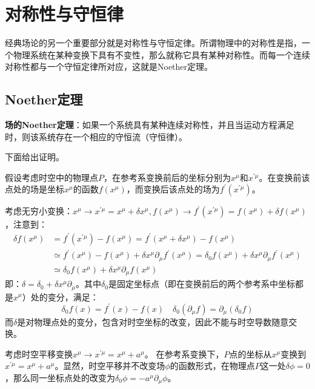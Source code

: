 \documentclass{book}
\begin{document}
\section{对称性与守恒律}
经典场论的另一个重要部分就是对称性与守恒定律。所谓物理中的对称性是指，一个物理系统在某种变换下具有不变性，那么就称它具有某种对称性。而每一个连续对称性都与一个守恒定律所对应，这就是Noether定理。

\subsection{Noether定理}
\textbf{场的Noether定理}：如果一个系统具有某种连续对称性，并且当运动方程满足时，则该系统存在一个相应的守恒流（守恒律）。

下面给出证明。

假设考虑时空中的物理点$P$，在参考系变换前后的坐标分别为$x^{\mu}$和$x^{\prime\mu}$。在变换前该点处的场是坐标$x^\mu$的函数$f(x^\mu)$，而变换后该点处的场为$f^\prime(x^{\prime\mu})$。

考虑无穷小变换：$x^\mu\to x^{\prime\mu}=x^{\mu}+\delta x^{\mu},f(x^\mu)\to f^\prime(x^{\prime\mu})=f(x^\mu)+\delta f(x^\mu)$，注意到：
\begin{equation}
\begin{aligned}
\delta f(x^\mu)&=f^\prime(x^{\prime \mu})-f(x^\mu)=f^\prime(x^{\mu}+\delta x^{\mu})-f(x^\mu)\\&\simeq f^\prime(x^\mu)-f(x^\mu)+\delta x^\mu \partial_\mu f^\prime(x^\mu)
=\delta_0 f(x^\mu)+\delta x^\mu \partial_\mu f^\prime(x^\mu)\\&\simeq\delta_0 f(x^\mu)+\delta x^\mu \partial_\mu f(x^\mu)
\end{aligned}
\end{equation}
即：$\delta=\delta_0+\delta x^\mu \partial_\mu$。其中$\delta_0$是固定坐标点（即在变换前后的两个参考系中坐标都是$x^\mu$）处的变分，满足：
\begin{equation}
	\delta_0 f(x)=f^\prime(x)-f(x)\quad \delta_0(\partial_\mu f)=\partial_\mu(\delta_0 f)
\end{equation}
而$\delta$是对物理点处的变分，包含对时空坐标的改变，因此不能与时空导数随意交换。

\begin{mdframed}[frametitle={Example}]
    考虑时空平移变换$x^\mu\to x^{\prime\mu}=x^\mu+a^\mu$。
    在参考系变换下，$P$点的坐标从$x^\mu$变换到$x^{\prime\mu}=x^\mu+a^\mu$。显然，时空平移并不改变场$\phi$的函数形式，在物理点$P$这一处$\delta \phi=0$，那么同一坐标点处的改变为$\delta_0 \phi=-a^\mu\partial_\mu\phi$。
\end{mdframed}
\end{document}
